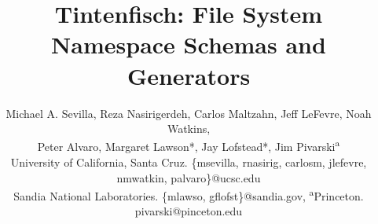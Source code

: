 \documentclass[letterpaper,twocolumn,10pt]{article}
\begin{document}
\date{}

\title{Tintenfisch: File System Namespace Schemas and Generators\vspace{-1em}}

\author{
{\rm Michael A. Sevilla, Reza Nasirigerdeh, Carlos Maltzahn, Jeff LeFevre, Noah Watkins,}\\
{\rm Peter Alvaro, Margaret Lawson*, Jay Lofstead*, Jim Pivarski\textsuperscript{a}}\\
{\small University of California, Santa Cruz. \{msevilla, rnasirig, carlosm, jlefevre, nmwatkin, palvaro\}@ucsc.edu}\\
{\small *Sandia National Laboratories. \{mlawso, gflofst\}@sandia.gov, \textsuperscript{a}Princeton. pivarski@pinceton.edu}
} %

\maketitle




%





{\footnotesize 
}
\end{document}
